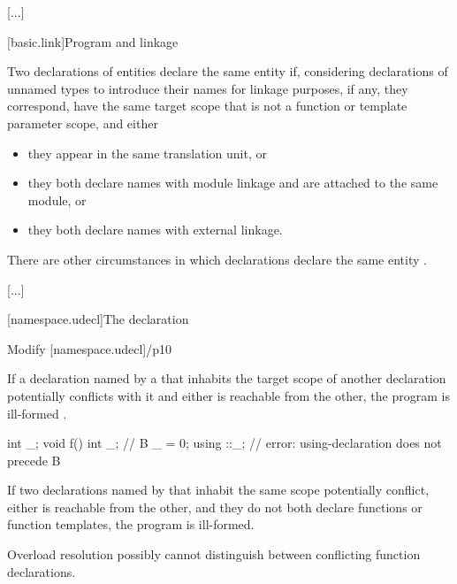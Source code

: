 \documentclass{wg21}
\begin{document}
{\textcolor{noteclr}{[...]}

[basic.link]{Program and linkage}%


\pnum
Two declarations of entities declare the same entity
if, considering declarations of unnamed types to introduce their names
for linkage purposes, if any,
they correspond,
have the same target scope that is not a function or template parameter scope,
and either
\begin{itemize}
    \item
    they appear in the same translation unit, or
    \item
    they both declare names with module linkage and are attached to the same module, or
    \item
    they both declare names with external linkage.
\end{itemize}
\begin{note}
    There are other circumstances in which declarations declare the same entity%
    .
\end{note}

\textcolor{noteclr}{[...]}

[namespace.udecl]{The  declaration}%

\textcolor{noteclr}{Modify [namespace.udecl]/p10 }

\pnum
If a declaration named by a 
that inhabits the target scope of another declaration 
potentially conflicts with it  and
either is reachable from the other, the program is ill-formed .

\begin{addedblock}
\begin{example}
\begin{codeblock}
int _;
void f() {
	int _;   // B
	_ = 0;
	using ::_;  // error: using-declaration does not precede B
}
\end{codeblock}
\end{example}
\end{addedblock}

If two declarations named by 
that inhabit the same scope potentially conflict,
either is reachable from the other, and
they do not both declare functions or function templates,
the program is ill-formed.
\begin{note}
    Overload resolution possibly cannot distinguish
    between conflicting function declarations.
\end{note}


}
\end{document}
